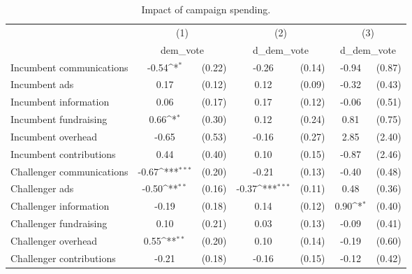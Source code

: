 \begin{table}[htbp]\centering
\def\sym#1{\ifmmode^{#1}\else\(^{#1}\)\fi}
\caption{Impact of campaign spending. \label{table:breakdown}}
\begin{tabular}{l*{3}{cc}}
\toprule
                    &\multicolumn{2}{c}{(1)}           &\multicolumn{2}{c}{(2)}           &\multicolumn{2}{c}{(3)}           \\
                    &\multicolumn{2}{c}{dem\_vote}      &\multicolumn{2}{c}{d\_dem\_vote}    &\multicolumn{2}{c}{d\_dem\_vote}    \\
\midrule
Incumbent communications&       -0.54\sym{*}  &      (0.22)&       -0.26         &      (0.14)&       -0.94         &      (0.87)\\
Incumbent ads       &        0.17         &      (0.12)&        0.12         &      (0.09)&       -0.32         &      (0.43)\\
Incumbent information&        0.06         &      (0.17)&        0.17         &      (0.12)&       -0.06         &      (0.51)\\
Incumbent fundraising&        0.66\sym{*}  &      (0.30)&        0.12         &      (0.24)&        0.81         &      (0.75)\\
Incumbent overhead  &       -0.65         &      (0.53)&       -0.16         &      (0.27)&        2.85         &      (2.40)\\
Incumbent contributions&        0.44         &      (0.40)&        0.10         &      (0.15)&       -0.87         &      (2.46)\\
Challenger communications&       -0.67\sym{***}&      (0.20)&       -0.21         &      (0.13)&       -0.40         &      (0.48)\\
Challenger ads      &       -0.50\sym{**} &      (0.16)&       -0.37\sym{***}&      (0.11)&        0.48         &      (0.36)\\
Challenger information&       -0.19         &      (0.18)&        0.14         &      (0.12)&        0.90\sym{*}  &      (0.40)\\
Challenger fundraising&        0.10         &      (0.21)&        0.03         &      (0.13)&       -0.09         &      (0.41)\\
Challenger overhead &        0.55\sym{**} &      (0.20)&        0.10         &      (0.14)&       -0.19         &      (0.60)\\
Challenger contributions&       -0.21         &      (0.18)&       -0.16         &      (0.15)&       -0.12         &      (0.42)\\

\end{tabular}
\end{table}
